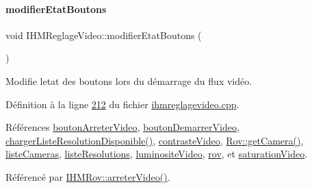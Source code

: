\mbox{\label{class_i_h_m_reglage_video_ac838581ba03f52e79064cb91ebabb35d}} 
\paragraph{\texorpdfstring{modifier\+Etat\+Boutons}{modifierEtatBoutons}}
{\footnotesize\ttfamily void I\+H\+M\+Reglage\+Video\+::modifier\+Etat\+Boutons (\begin{DoxyParamCaption}{ }\end{DoxyParamCaption})\hspace{0.3cm}{\ttfamily [slot]}}



Modifie l\textquotesingle{}etat des boutons lors du démarrage du flux vidéo. 



Définition à la ligne \hyperlink{ihmreglagevideo_8cpp_source_l00212}{212} du fichier \hyperlink{ihmreglagevideo_8cpp_source}{ihmreglagevideo.\+cpp}.



Références \hyperlink{ihmreglagevideo_8h_source_l00042}{bouton\+Arreter\+Video}, \hyperlink{ihmreglagevideo_8h_source_l00041}{bouton\+Demarrer\+Video}, \hyperlink{ihmreglagevideo_8cpp_source_l00172}{charger\+Liste\+Resolution\+Disponible()}, \hyperlink{ihmreglagevideo_8h_source_l00035}{contraste\+Video}, \hyperlink{rov_8cpp_source_l00144}{Rov\+::get\+Camera()}, \hyperlink{ihmreglagevideo_8h_source_l00038}{liste\+Cameras}, \hyperlink{ihmreglagevideo_8h_source_l00040}{liste\+Resolutions}, \hyperlink{ihmreglagevideo_8h_source_l00034}{luminosite\+Video}, \hyperlink{ihmreglagevideo_8h_source_l00027}{rov}, et \hyperlink{ihmreglagevideo_8h_source_l00036}{saturation\+Video}.



Référencé par \hyperlink{ihmrov_8cpp_source_l00234}{I\+H\+M\+Rov\+::arreter\+Video()}.


